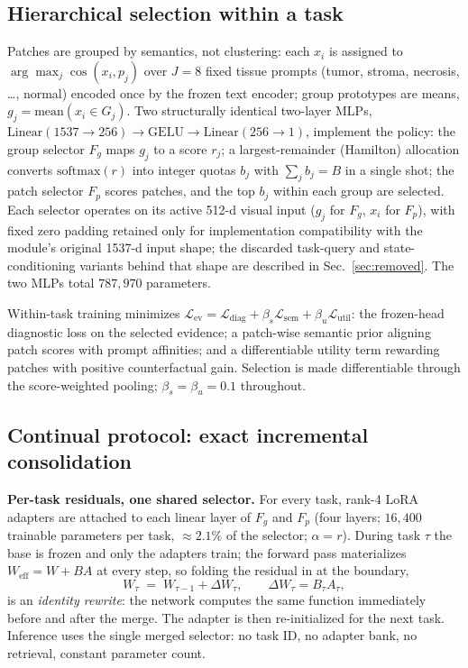 \documentclass[11pt]{article}
\newcommand{\Fg}{F_{g}} \newcommand{\Fp}{F_{p}}
\begin{document}
\subsection{Hierarchical selection within a task}\label{sec:hier}
Patches are grouped by semantics, not clustering: each $x_i$ is assigned to $\arg\max_j \cos(x_i, p_j)$ over $J{=}8$ fixed tissue prompts (tumor, stroma, necrosis, \dots, normal) encoded once by the frozen text encoder; group prototypes are means, $g_j = \mathrm{mean}(x_i \in G_j)$. Two structurally identical two-layer MLPs, $\mathrm{Linear}(1537{\to}256)\to\mathrm{GELU}\to\mathrm{Linear}(256{\to}1)$, implement the policy: the group selector $\Fg$ maps $g_j$ to a score $r_j$; a largest-remainder (Hamilton) allocation converts $\mathrm{softmax}(r)$ into integer quotas $b_j$ with $\sum_j b_j = B$ in a single shot; the patch selector $\Fp$ scores patches, and the top $b_j$ within each group are selected. Each selector operates on its active 512-d visual input ($g_j$ for $\Fg$, $x_i$ for $\Fp$), with fixed zero padding retained only for implementation compatibility with the module's original 1537-d input shape; the discarded task-query and state-conditioning variants behind that shape are described in Sec.~\ref{sec:removed}. The two MLPs total $787{,}970$ parameters.

Within-task training minimizes $\mathcal{L}_{\mathrm{ev}} = \mathcal{L}_{\mathrm{diag}} + \beta_s\mathcal{L}_{\mathrm{sem}} + \beta_u\mathcal{L}_{\mathrm{util}}$: the frozen-head diagnostic loss on the selected evidence; a patch-wise semantic prior aligning patch scores with prompt affinities; and a differentiable utility term rewarding patches with positive counterfactual gain. Selection is made differentiable through the score-weighted pooling; $\beta_s=\beta_u=0.1$ throughout.

\subsection{Continual protocol: exact incremental consolidation}\label{sec:cl}
\textbf{Per-task residuals, one shared selector.} For every task, rank-4 LoRA adapters \citep{hu2022lora} are attached to each linear layer of $\Fg$ and $\Fp$ (four layers; $16{,}400$ trainable parameters per task, ${\approx}2.1\%$ of the selector; $\alpha{=}r$). During task $\tau$ the base is frozen and only the adapters train; the forward pass materializes $W_{\mathrm{eff}} = W + BA$ at every step, so folding the residual in at the boundary,
\begin{equation}
W_\tau \;=\; W_{\tau-1} + \Delta W_\tau,\qquad \Delta W_\tau = B_\tau A_\tau,
\end{equation}
is an \emph{identity rewrite}: the network computes the same function immediately before and after the merge. The adapter is then re-initialized for the next task. Inference uses the single merged selector: no task ID, no adapter bank, no retrieval, constant parameter count.
\end{document}
